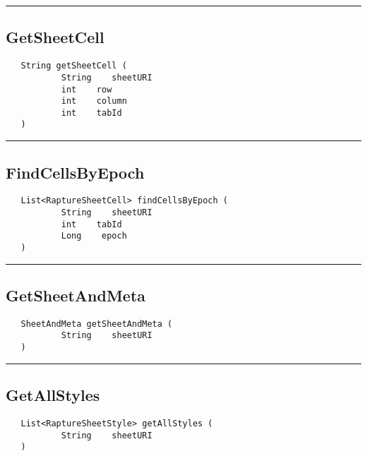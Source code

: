 \rule{15cm}{2pt}
\subsection{GetSheetCell}
\label{Api:GetSheetCell}
\begin{verbatim}
   String getSheetCell (
           String    sheetURI
           int    row
           int    column
           int    tabId
   )
\end{verbatim}



\rule{15cm}{2pt}
\subsection{FindCellsByEpoch}
\label{Api:FindCellsByEpoch}
\begin{verbatim}
   List<RaptureSheetCell> findCellsByEpoch (
           String    sheetURI
           int    tabId
           Long    epoch
   )
\end{verbatim}



\rule{15cm}{2pt}
\subsection{GetSheetAndMeta}
\label{Api:GetSheetAndMeta}
\begin{verbatim}
   SheetAndMeta getSheetAndMeta (
           String    sheetURI
   )
\end{verbatim}



\rule{15cm}{2pt}
\subsection{GetAllStyles}
\label{Api:GetAllStyles}
\begin{verbatim}
   List<RaptureSheetStyle> getAllStyles (
           String    sheetURI
   )
\end{verbatim}



